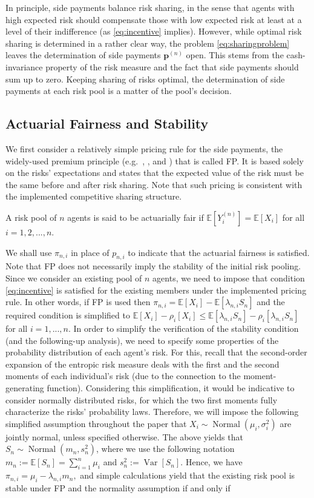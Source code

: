 \documentclass[fleqn,mnsc,nonblindrev]{informs4}
\newcommand{\Normal}{\operatorname{Normal}}
\newcommand{\EE}{\mathbb{E}}
\newcommand{\Var}{\operatorname{Var}}
\begin{document}
In principle, side payments balance risk sharing, in the sense that agents with high expected risk should compensate those with low expected risk at least at a level of their indifference (as \eqref{eq:incentive} implies). However, while optimal risk sharing is determined in a rather clear way, the problem \eqref{eq:sharingproblem} leaves the determination of side payments $\mathbf{p}^{(n)}$ open. This stems from the cash-invariance property of the risk measure and the fact that side payments should sum up to zero. Keeping sharing of risks optimal, the determination of side payments at each risk pool is a matter of the pool's decision.

\subsection{Actuarial Fairness and Stability}\label{subsec:stability}
We first consider a relatively simple pricing rule for the side payments, the widely-used premium principle (e.g.~\cite{donnelly2015actuarial}, \cite{aase2002perspectives}, and \cite{denuit2019size}) that is called FP. It is based solely on the risks' expectations and states that the expected value of the risk must be the same before and after risk sharing.    {Note that such pricing is consistent with the implemented competitive sharing structure.}
\begin{definition}\label{def:fairness}
A risk pool of $n$ agents is said to be actuarially fair if $\EE\left[Y_i^{(n)}\right]=\EE[X_i]$ for all $i=1,2,...,n.$
\end{definition}
We shall use $\pi_{n,i}$ in place of $p_{n,i}$ to indicate that the actuarial fairness is satisfied. Note that FP does not necessarily imply the stability of the initial risk pooling. Since we consider an existing pool of $n$ agents, we need to impose that condition \eqref{eq:incentive} is satisfied for the existing members under the implemented pricing rule. In other words, if FP is used then  $\pi_{n,i}=\EE\left[X_i\right]-\EE[\lambda_{n,i}S_n]$ and the required condition is simplified to $\EE\left[X_i\right]- \rho_i\left[X_i\right] \leq \EE[\lambda_{n,i}S_n]-\rho_i\left[\lambda_{n,i}S_n\right]$ for all $i=1,...,n.$ In order to simplify the verification of the stability condition (and the following-up analysis), we need to specify some properties of the probability distribution of each agent's risk. For this, recall that the second-order expansion of the entropic risk measure deals with the first and the second moments of each individual's risk (due to the connection to the moment-generating function). Considering this simplification, it would be indicative to consider normally distributed risks, for which the two first moments fully characterize the risks' probability laws. Therefore, we will impose the following simplified assumption  {throughout the paper that $X_i\sim\Normal(\mu_{i},\sigma_{i}^2)$ are jointly normal, unless specified otherwise.} The above yields that $S_n\sim\Normal(m_n,s_n^2)$, where we use the following notation $m_n:=\EE[S_n]=\sum_{i=1}^n\mu_i$ and $s_n^2:=\Var[S_n].$ Hence, we have  {$\pi_{n,i}=\mu_i-\lambda_{n,i}m_n,$} and simple calculations yield that the existing risk pool is stable under FP and the normality assumption if and only if  
\end{document}
